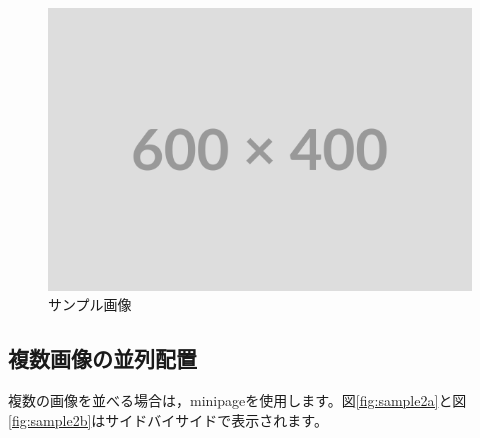 \documentclass[11pt,a4paper,dvipdfmx,twocolumn]{jarticle}
\begin{document}
\begin{figure}[H]
    \centering
    \includegraphics[width=0.9\columnwidth]{images/placeholder.png}
    \caption{サンプル画像}
    \label{fig:sample1}
\end{figure}

\subsection{複数画像の並列配置}

複数の画像を並べる場合は，minipageを使用します。図\ref{fig:sample2a}と図\ref{fig:sample2b}はサイドバイサイドで表示されます。
\end{document}
